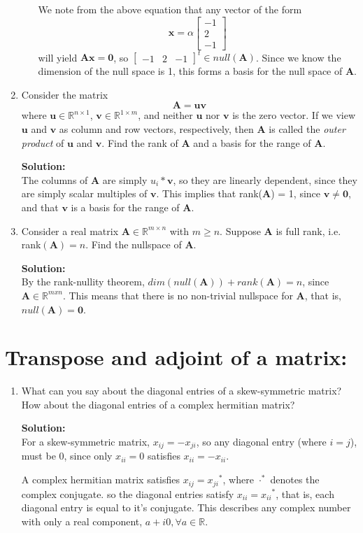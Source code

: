\documentclass[]{article}
\newcommand{\R}{\mathbb{R}}				%
\newcommand{\bbm}{\begin{bmatrix}}		%
\newcommand{\ebm}{\end{bmatrix}}		%
\newcommand{\A}{\bm{A}}					%
\newcommand{\solution}{\vskip 0.5cm \textbf{\large Solution:} \\}
\begin{document}
\begin{enumerate}[resume]
\begin{enumerate}
        We note from the above equation that any vector of the form
        \[
        \bm{x} = \alpha \bbm -1 \\ 2 \\ -1 \ebm
        \]
        will yield $\bm{Ax} = \bm{0}$, so $\bbm -1 & 2 & -1 \ebm^t \in
        null(\A)$. Since we know the dimension of the null space
        is 1, this forms a basis for the null space of $\A$.
        
	  \end{enumerate}

	\item Consider the matrix
	  \[
	  \A = \bm{uv}
	  \]
	  where $\bm{u}\in\R^{n\times 1}$, $\bm{v}\in\R^{1\times m}$, and
      neither $\bm{u}$ nor $\bm{v}$ is the zero vector. If we view
      $\bm{u}$ and $\bm{v}$ as column and row vectors, respectively,
      then $\A$ is called the \textit{outer product} of $\bm{u}$ and
      $\bm{v}$. Find the rank of $\A$ and a basis for the range of
      $\A$.

	  \solution The columns of $\A$ are simply $u_i * \bm{v}$, so they
      are linearly dependent, since they are simply scalar multiples
      of $\bm{v}$. This implies that rank($\A$) = 1, since $\bm{v}
      \neq \bm{0}$, and that $\bm{v}$ is a basis for the range of
      $\A$.



	\item Consider a real matrix $\A\in\R^{m\times n}$ with $m\geq n$. Suppose $\A$ is full rank, i.e. rank$(\A)=n$. Find the nullspace of $\A$.

	  \solution By the rank-nullity theorem, $dim(null(\A)) + rank(\A)
      = n$, since $\A \in \R^{mxn}$. This means that there is no
      non-trivial nullspace for $\A$, that is, $null(\A) =
      \bm{0}$.


    \end{enumerate}

    \section*{Transpose and adjoint of a matrix:}
    \begin{enumerate}[resume]
	\item What can you say about the diagonal entries of a skew-symmetric matrix? How about the diagonal entries of a complex hermitian matrix?

	  \solution For a skew-symmetric matrix, $x_{ij} = -x_{ji}$, so
      any diagonal entry (where $i = j$), must be 0, since only
      $x_{ii} = 0$ satisfies $x_{ii} = -x_{ii}$.

      A complex hermitian matrix satisfies $x_{ij} = {x_{ji}}^*$,
      where $\cdot ^ *$ denotes the complex conjugate. so the diagonal
      entries satisfy $x_{ii} = {x_{ii}}^*$, that is, each diagonal
      entry is equal to it's conjugate. This describes any complex
      number with only a real component, $a + i0, \forall a \in \R$.

    \end{enumerate}
\end{document}
